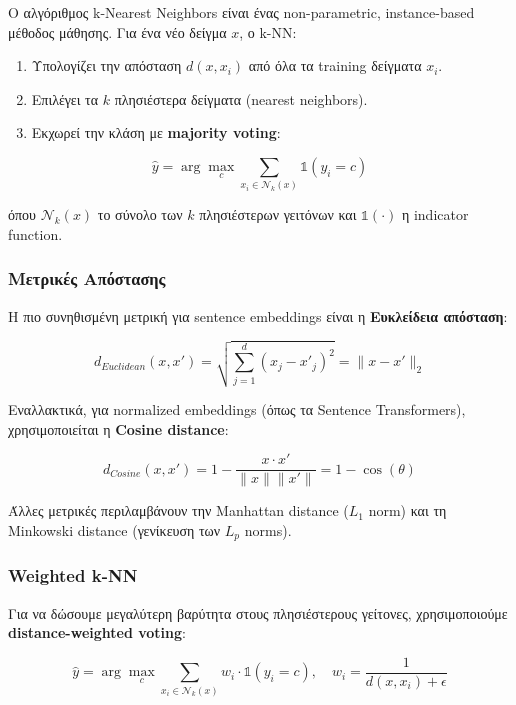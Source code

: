 \documentclass[12pt,a4paper,twoside]{book}
\begin{document}
Ο αλγόριθμος k-Nearest Neighbors είναι ένας non-parametric, instance-based μέθοδος μάθησης. Για ένα νέο δείγμα $x$, ο k-NN:

\begin{enumerate}
    \item Υπολογίζει την απόσταση \(d(x, x_i)\) από όλα τα training δείγματα \(x_i\).
    \item Επιλέγει τα \(k\) πλησιέστερα δείγματα (nearest neighbors).
    \item Εκχωρεί την κλάση με \textbf{majority voting}:
\end{enumerate}

\begin{equation}
    \hat{y} = \arg\max_{c} \sum_{x_i \in \mathcal{N}_k(x)} \mathbb{1}(y_i = c)
\end{equation}

όπου \(\mathcal{N}_k(x)\) το σύνολο των \(k\) πλησιέστερων γειτόνων και \(\mathbb{1}(\cdot)\) η indicator function.

\subsubsection*{Μετρικές Απόστασης}

Η πιο συνηθισμένη μετρική για sentence embeddings είναι η \textbf{Ευκλείδεια απόσταση}:

\begin{equation}
    d_{Euclidean}(x, x') = \sqrt{\sum_{j=1}^{d} (x_j - x'_j)^2} = \|x - x'\|_2
\end{equation}

Εναλλακτικά, για normalized embeddings (όπως τα Sentence Transformers), χρησιμοποιείται η \textbf{Cosine distance}:

\begin{equation}
    d_{Cosine}(x, x') = 1 - \frac{x \cdot x'}{\|x\| \|x'\|} = 1 - \cos(\theta)
\end{equation}

Άλλες μετρικές περιλαμβάνουν την Manhattan distance (\(L_1\) norm) και τη Minkowski distance (γενίκευση των \(L_p\) norms).

\subsubsection*{Weighted k-NN}

Για να δώσουμε μεγαλύτερη βαρύτητα στους πλησιέστερους γείτονες, χρησιμοποιούμε \textbf{distance-weighted voting}:

\begin{equation}
    \hat{y} = \arg\max_{c} \sum_{x_i \in \mathcal{N}_k(x)} w_i \cdot \mathbb{1}(y_i = c), \quad w_i = \frac{1}{d(x, x_i) + \epsilon}
\end{equation}
\end{document}
